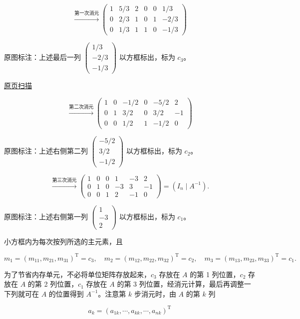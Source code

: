 \documentclass[
  10pt,
  fontset=fandol]{ctexart}
\begin{document}
\[
\xrightarrow{\text{第一次消元}}
\left(\begin{array}{rrr|rrr}
1&5/3&2&0&0&1/3\\
0&2/3&1&0&1&-2/3\\
0&1/3&1&1&0&-1/3
\end{array}\right)
\]

原图标注：上述最后一列 \(\begin{pmatrix}1/3\\-2/3\\-1/3\end{pmatrix}\) 以方框标出，标为 \(c_3\)。

\href{../../source-images/pdf-190.jpeg}{原页扫描}

\[
\xrightarrow{\text{第二次消元}}
\left(\begin{array}{rrr|rrr}
1&0&-1/2&0&-5/2&2\\
0&1&3/2&0&3/2&-1\\
0&0&\boxed{1/2}&1&-1/2&0
\end{array}\right)
\]

原图标注：上述右侧第二列 \(\begin{pmatrix}-5/2\\3/2\\-1/2\end{pmatrix}\) 以方框标出，标为 \(c_2\)。

\[
\xrightarrow{\text{第三次消元}}
\left(\begin{array}{rrr|rrr}
1&0&0&1&-3&2\\
0&1&0&-3&3&-1\\
0&0&1&2&-1&0
\end{array}\right)=(I_n\mid A^{-1}).
\]

原图标注：上述右侧第一列 \(\begin{pmatrix}1\\-3\\2\end{pmatrix}\) 以方框标出，标为 \(c_1\)。

小方框内为每次按列所选的主元素，且

\[m_1=(m_{11},m_{21},m_{31})^{\mathrm T}=c_3,\quad
m_2=(m_{12},m_{22},m_{32})^{\mathrm T}=c_2,\quad
m_3=(m_{13},m_{23},m_{33})^{\mathrm T}=c_1.\]

为了节省内存单元，不必将单位矩阵存放起来，\(c_3\) 存放在 \(A\) 的第 1 列位置，\(c_2\) 存放在 \(A\) 的第 2 列位置，\(c_1\) 存放在 \(A\) 的第 3 列位置，经消元计算，最后再调整一下列就可在 \(A\) 的位置得到 \(A^{-1}\)。注意第 \(k\) 步消元时，由 \(A\) 的第 \(k\) 列

\[a_k=(a_{1k},\cdots,a_{kk},\cdots,a_{nk})^{\mathrm T}\]
\end{document}
